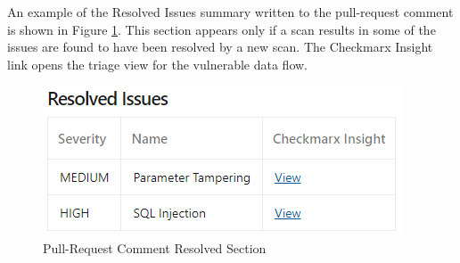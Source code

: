 An example of the Resolved Issues summary written to the pull-request comment
is shown in Figure
\ref{fig:pr-resolved-section}. This section appears only if a scan results in
some of the issues are found to have been resolved by a new scan.
The Checkmarx Insight link opens the triage view for the vulnerable
data flow.

\begin{figure}[ht]
    \includegraphics[width=\textwidth]{graphics/pr-resolved.png}
    \caption{Pull-Request Comment Resolved Section}
    \label{fig:pr-resolved-section}
\end{figure}

